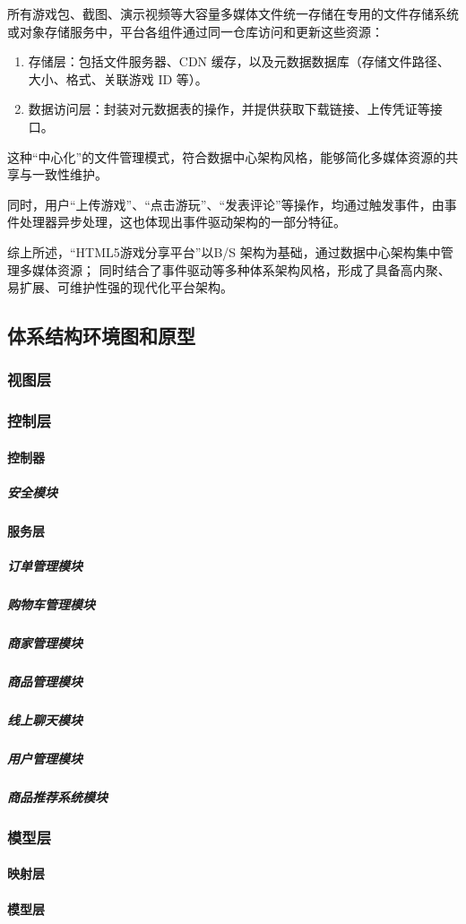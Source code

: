 \documentclass[12pt]{ctexart} %
\begin{document}
所有游戏包、截图、演示视频等大容量多媒体文件统一存储在专用的文件存储系统或对象存储服务中，平台各组件通过同一仓库访问和更新这些资源：
\begin{enumerate}
  \item 存储层：包括文件服务器、CDN 缓存，以及元数据数据库（存储文件路径、大小、格式、关联游戏 ID 等）。
  \item 数据访问层：封装对元数据表的操作，并提供获取下载链接、上传凭证等接口。
\end{enumerate}
这种“中心化”的文件管理模式，符合数据中心架构风格，能够简化多媒体资源的共享与一致性维护。

同时，用户“上传游戏”、“点击游玩”、“发表评论”等操作，均通过触发事件，由事件处理器异步处理，这也体现出事件驱动架构的一部分特征。

综上所述，“HTML5游戏分享平台”以B/S 架构为基础，通过数据中心架构集中管理多媒体资源；
同时结合了事件驱动等多种体系架构风格，形成了具备高内聚、易扩展、可维护性强的现代化平台架构。


\subsection{体系结构环境图和原型}

\subsubsection{视图层}
\subsubsection{控制层}
\paragraph{控制器}
\subparagraph{安全模块}
\paragraph{服务层}
\subparagraph{订单管理模块}
\subparagraph{购物车管理模块}
\subparagraph{商家管理模块}
\subparagraph{商品管理模块}
\subparagraph{线上聊天模块}
\subparagraph{用户管理模块}
\subparagraph{商品推荐系统模块}
\subsubsection{模型层}
\paragraph{映射层}
\paragraph{模型层}
\end{document}
